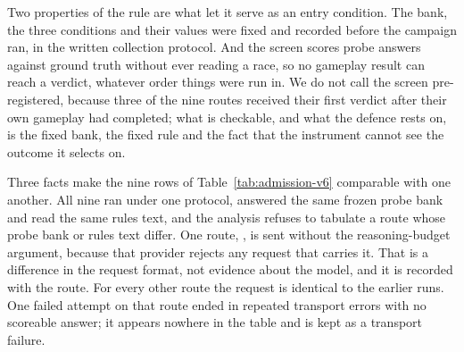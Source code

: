 \documentclass{article}
\begin{document}
Two properties of the rule are what let it serve as an entry condition. The
bank, the three conditions and their values were fixed and recorded before the
campaign ran, in the written collection protocol. And the screen
scores probe answers against ground truth without ever reading a race, so no
gameplay result can reach a verdict, whatever order things were run in. We do
not call the screen pre-registered, because three of the nine routes received
their first verdict after their own gameplay had completed; what is checkable,
and what the defence rests on, is the fixed bank, the fixed rule and the fact
that the instrument cannot see the outcome it selects on.

Three facts make the nine rows of Table~\ref{tab:admission-v6} comparable with
one another. All nine ran under one protocol, answered the same frozen probe
bank and read the same rules text, and the analysis refuses to tabulate a route
whose probe bank or rules text differ. One route,
, is sent without the reasoning-budget
argument, because that provider rejects any request that carries it. That is a
difference in the request format, not evidence about the model, and it is
recorded with the route. For every other route the request is identical to the
earlier runs. One failed attempt on that route ended in repeated transport
errors with no scoreable answer; it appears nowhere in the table and is kept as
a transport failure.
\end{document}
